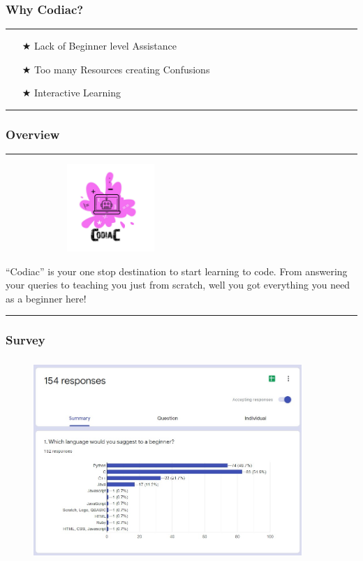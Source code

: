 \documentclass[14pt]{beamer}
\begin{document}
\begin{frame}
    \frametitle{Why Codiac?}
    \noindent
    {\color{pink} \rule{\linewidth}{0.7mm} }
    \begin{itemize}
    \item [$\bigstar$] Lack of Beginner level Assistance \\
    \item [$\bigstar$] Too many Resources creating Confusions \\  
   \item [$\bigstar$] Interactive Learning \\
    \end{itemize}
    \noindent
     {\color{pink} \rule{\linewidth}{0.7mm}}
\end{frame}


\begin{frame}
\frametitle{Overview}
\noindent
{\color{pink} \rule{\linewidth}{0.7mm} }
     \begin{figure}[htbp]
      \centerline{\includegraphics[width=2.3in, height=1.3in]{./Codiac/logos/logo.jpeg}}
     \end{figure}
\small ``Codiac'' is your one stop destination to start learning to code. From answering your queries to teaching you just from scratch, well you got everything you need as a beginner here!
\noindent
{\color{pink} \rule{\linewidth}{0.7mm} } 
\end{frame}   

\begin{frame}
     \frametitle{Survey}
     \begin{figure}[htbp]
         \centerline{\includegraphics[width=4in, height=3in]{./Codiac/logos/form.jpeg}}
         \begin{spacing}{0.25}
         \end{spacing}
     \end{figure}
 \end{frame}
\end{document}
